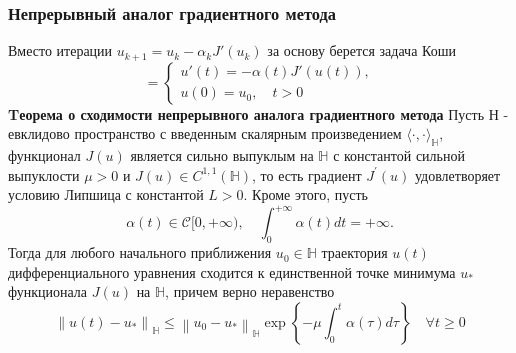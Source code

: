 \documentclass[A4]{article}
\begin{document}
\subsubsection{Непрерывный аналог градиентного метода}
Вместо итерации $u_{k+1}=u_k-\alpha_k J'(u_k)$ за основу берется задача Коши
\begin{equation*}
=\left\{\begin{array}{l}
u'(t)=-\alpha(t)J'(u(t)),\\
u(0)=u_0,\quad t>0
\end{array}\right.
\end{equation*}
\textbf{Tеорема о сходимости непрерывного аналога градиентного метода} Пусть $ \mathbb{Н}$ - евклидово пространство с введенным скалярным произведением $ \langle\cdot, \cdot\rangle_{\mathbb{H}}$, функционал $ J(u) $ является сильно выпуклым на $ \mathbb{H} $ с константой сильной выпуклости $ \mu>0 $ и $ J(u) \in C^{1,1}(\mathbb{H})$, то есть градиент $ J^{\prime}(u) $ удовлетворяет условию Липшица с константой $ L>0$. Кроме этого, пусть
\begin{equation*}
\alpha(t) \in\mathcal{C}[0,+\infty), \quad \int_{0}^{+\infty} \alpha(t) d t=+\infty .
\end{equation*}
Тогда для любого начального приближения $ u_{0} \in \mathbb{H} $ траектория $ u(t) $ дифференциального уравнения сходится к единственной точке минимума $ u_{*} $ функционала $ J(u)$ на $ \mathbb{H}$, причем верно неравенство
\begin{equation*}
\left\|u(t)-u_{*}\right\|_{\mathbb{H}} \leqslant\left\|u_{0}-u_{*}\right\|_{\mathbb{H}} \exp \left\{-\mu \int_{0}^{t} \alpha(\tau) d \tau\right\} \quad \forall t \geqslant 0
\end{equation*}
\end{document}
